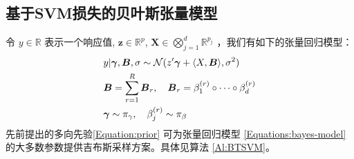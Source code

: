 \documentclass[AutoFakeBold]{LZUThesis}
\begin{document}
\subsection{基于SVM损失的贝叶斯张量模型}
令 \( y \in \mathbb{R} \) 表示一个响应值,  \( \mathbf{z} \in \mathbb{R}^p \), \( \mathbf{X} \in \bigotimes_{j=1}^{d} \mathbb{R}^{p_j} \)
，我们有如下的张量回归模型：
\begin{align}
	&y | \boldsymbol{\gamma}, \boldsymbol{B}, \sigma \sim \mathcal{N}(z^\prime \boldsymbol{\gamma} + \langle X, \boldsymbol{B} \rangle, \sigma^2) \notag \\
	&\boldsymbol{B} = \sum_{r=1}^{R} \boldsymbol{B}_r, \quad \boldsymbol{B}_r = \beta^{(r)}_1 \circ \cdots \circ \beta^{(r)}_d \notag \\
	&\boldsymbol{\gamma} \sim \pi_\gamma, \quad \beta^{(r)}_j \sim \pi_\beta \label{Equations:bayes-model}
\end{align}
先前提出的多向先验\eqref{Equation:prior} 可为张量回归模型 \eqref{Equations:bayes-model} 的大多数参数提供吉布斯采样方案。具体见算法 \ref{Al:BTSVM}。
\end{document}
